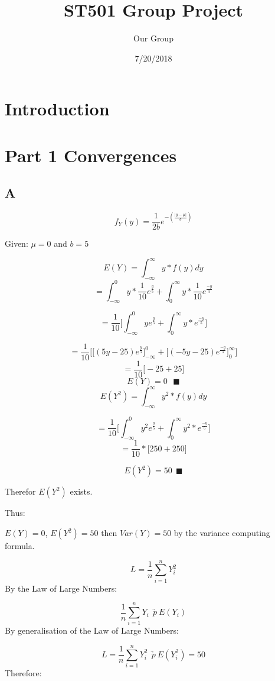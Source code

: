\documentclass[]{article}
\title{ST501 Group Project}
\author{Our Group}
\date{7/20/2018}
\begin{document}
\maketitle

\hypertarget{introduction}{%
\section{Introduction}\label{introduction}}

\hypertarget{part-1-convergences}{%
\section{Part 1 Convergences}\label{part-1-convergences}}

\hypertarget{a}{%
\subsection{A}\label{a}}

\[f_Y(y) = \frac{1}{2b}e^{-(\frac{|y-\mu|}{b})}\]

Given: \(\mu = 0\) and \(b=5\)

\[E(Y) = \int_{-\infty}^{\infty} y * f(y)dy\]
\[= \int_{-\infty}^0y*\frac{1}{10}e^{\frac{y}{5}} + \int^{\infty}_0y*\frac{1}{10}e^{\frac{-y}{5}}\]

\[= \frac{1}{10}\Bigg[\int_{-\infty}^0ye^{\frac{y}{5}} + \int^{\infty}_0y*e^{\frac{-y}{5}}\Bigg]\]

\[= \frac{1}{10}\Bigg[\Big[(5y-25)e^{\frac{y}{5}}\Big]_{-\infty}^0 + \Big[(-5y-25)e^{\frac{-y}{5}}\Big]_0^\infty\Bigg]\]
\[=\frac{1}{10}\Big[-25+25\Big]\] \[E(Y) = 0 \text{   }\blacksquare\]
\[E(Y^2) = \int_{-\infty}^{\infty} y^2 * f(y)dy\]

\[= \frac{1}{10}\Bigg[\int_{-\infty}^0y^2e^{\frac{y}{5}} + \int^{\infty}_0y^2*e^{\frac{-y}{5}}\Bigg]\]
\[= \frac{1}{10}*\Big[250+250\Big]\]

\[E(Y^2)= 50 \ \ \blacksquare\]

Therefor \(E(Y^2)\) exists.

Thus:

\(E(Y) = 0\), \(E(Y^2) = 50\) then \(Var(Y) = 50\) by the variance
computing formula.

\[L = \frac{1}{n}\sum_{i=1}^{n}Y_i^2\] By the Law of Large Numbers:

\[\frac{1}{n}\sum_{i=1}^{n}Y_i\ \ \underrightarrow{p} \ E(Y_i)\] By
generalisation of the Law of Large Numbers:

\[L = \frac{1}{n}\sum_{i=1}^{n}Y_i^2 \ \ \underrightarrow{p} \ E(Y_i^2) = 50\]
Therefore:
\end{document}
